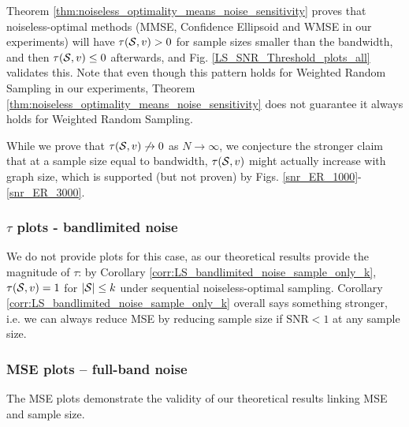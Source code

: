  Theorem \ref{thm:noiseless_optimality_means_noise_sensitivity} proves that noiseless-optimal methods (MMSE, Confidence Ellipsoid and WMSE in our experiments) will have $\tau(\mathcal{S},v) > 0$ for sample sizes smaller than the bandwidth, and then $\tau(\mathcal{S},v) \leq 0$ afterwards, and Fig. \ref{LS_SNR_Threshold_plots_all}  validates this. Note that even though this pattern holds for Weighted Random Sampling in our experiments, Theorem \ref{thm:noiseless_optimality_means_noise_sensitivity} does not guarantee it always holds for Weighted Random Sampling.

 While we prove that $\tau(\mathcal{S},v) \not\to 0$ as $N \to \infty$, we conjecture the stronger claim that at a sample size equal to bandwidth, $\tau(\mathcal{S},v)$ might actually increase with graph size, which is supported (but not proven) by Figs. \ref{snr_ER_1000}-\ref{snr_ER_3000}.


\subsubsection{$\tau$ plots - bandlimited noise}
We do not provide plots for this case, as our theoretical results provide the magnitude of $\tau$: by Corollary \ref {corr:LS_bandlimited_noise_sample_only_k}, $\tau(\mathcal{S},v) = 1$ for $|\mathcal{S}| \leq k$ under sequential noiseless-optimal sampling. Corollary \ref{corr:LS_bandlimited_noise_sample_only_k} overall says something stronger, i.e. we can always reduce MSE by reducing sample size if $\text{SNR} < 1$ at any sample size.

\subsubsection{MSE plots -- full-band noise}
The MSE plots demonstrate the validity of our theoretical results linking MSE and sample size.

